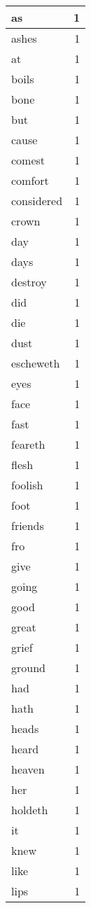 \begin{center}
\begin{longtable}{l|r}
as & 1 \\ \hline
ashes & 1 \\ \hline
at & 1 \\ \hline
boils & 1 \\ \hline
bone & 1 \\ \hline
but & 1 \\ \hline
cause & 1 \\ \hline
comest & 1 \\ \hline
comfort & 1 \\ \hline
considered & 1 \\ \hline
crown & 1 \\ \hline
day & 1 \\ \hline
days & 1 \\ \hline
destroy & 1 \\ \hline
did & 1 \\ \hline
die & 1 \\ \hline
dust & 1 \\ \hline
escheweth & 1 \\ \hline
eyes & 1 \\ \hline
face & 1 \\ \hline
fast & 1 \\ \hline
feareth & 1 \\ \hline
flesh & 1 \\ \hline
foolish & 1 \\ \hline
foot & 1 \\ \hline
friends & 1 \\ \hline
fro & 1 \\ \hline
give & 1 \\ \hline
going & 1 \\ \hline
good & 1 \\ \hline
great & 1 \\ \hline
grief & 1 \\ \hline
ground & 1 \\ \hline
had & 1 \\ \hline
hath & 1 \\ \hline
heads & 1 \\ \hline
heard & 1 \\ \hline
heaven & 1 \\ \hline
her & 1 \\ \hline
holdeth & 1 \\ \hline
it & 1 \\ \hline
knew & 1 \\ \hline
like & 1 \\ \hline
lips & 1 \\ \hline

\end{longtable}
\end{center}

